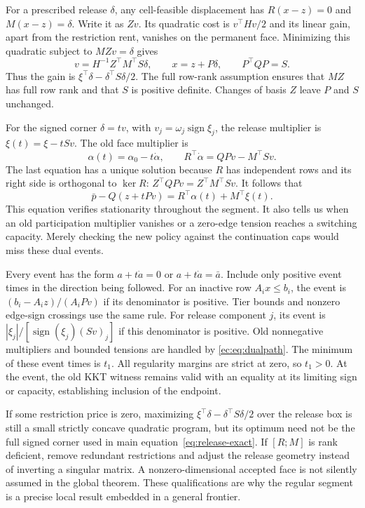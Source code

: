 \documentclass[11pt,letterpaper]{article}
\theoremstyle{definition}\newtheorem{remark}[theorem]{Remark}
\begin{document}
For a prescribed release $\delta$, any cell-feasible displacement has $R(x-z)=0$ and $M(x-z)=\delta$. Write it as $Zv$. Its quadratic cost is $v^\top Hv/2$ and its linear gain, apart from the restriction rent, vanishes on the permanent face. Minimizing this quadratic subject to $MZv=\delta$ gives
\[
 v=H^{-1}Z^\top M^\top S\delta,\qquad
 x=z+P\delta,\qquad P^\top QP=S.
\]
Thus the gain is $\xi^\top\delta-\delta^\top S\delta/2$. The full row-rank assumption ensures that $MZ$ has full row rank and that $S$ is positive definite. Changes of basis $Z$ leave $P$ and $S$ unchanged.

For the signed corner $\delta=tv$, with $v_j=\omega_j\operatorname{sign}\xi_j$, the release multiplier is $\xi(t)=\xi-tSv$. The old face multiplier is
\begin{equation}\label{ec:eq:dualpath}
 \alpha(t)=\alpha_0-t\dot\alpha,\qquad
 R^\top\dot\alpha=QPv-M^\top Sv.
\end{equation}
The last equation has a unique solution because $R$ has independent rows and its right side is orthogonal to $\ker R$:
$Z^\top QPv=Z^\top M^\top Sv$. It follows that
\[
 \bar p-Q(z+tPv)=R^\top\alpha(t)+M^\top\xi(t).
\]
This equation verifies stationarity throughout the segment. It also tells us when an old participation multiplier vanishes or a zero-edge tension reaches a switching capacity. Merely checking the new policy against the continuation caps would miss these dual events.

Every event has the form $a+t\dot a=0$ or $a+t\dot a=\bar a$. Include only positive event times in the direction being followed. For an inactive row $A_i x\leq b_i$, the event is $(b_i-A_i z)/(A_iPv)$ if its denominator is positive. Tier bounds and nonzero edge-sign crossings use the same rule. For release component $j$, its event is $|\xi_j|/[\operatorname{sign}(\xi_j)(Sv)_j]$ if this denominator is positive. Old nonnegative multipliers and bounded tensions are handled by \eqref{ec:eq:dualpath}. The minimum of these event times is $t_1$. All regularity margins are strict at zero, so $t_1>0$. At the event, the old KKT witness remains valid with an equality at its limiting sign or capacity, establishing inclusion of the endpoint.

If some restriction price is zero, maximizing
$\xi^\top\delta-\delta^\top S\delta/2$ over the release box is still a small strictly concave quadratic program, but its optimum need not be the full signed corner used in main equation~\eqref{eq:release-exact}. If $[R;M]$ is rank deficient, remove redundant restrictions and adjust the release geometry instead of inverting a singular matrix. A nonzero-dimensional accepted face is not silently assumed in the global theorem. These qualifications are why the regular segment is a precise local result embedded in a general frontier.
\end{document}
